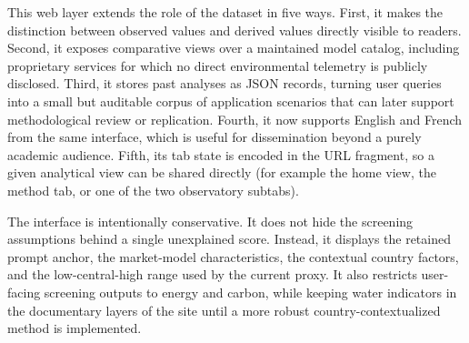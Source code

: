 \documentclass[11pt,a4paper]{article}
\begin{document}
This web layer extends the role of the dataset in five ways. First, it makes the distinction between observed values and derived values directly visible to readers. Second, it exposes comparative views over a maintained model catalog, including proprietary services for which no direct environmental telemetry is publicly disclosed. Third, it stores past analyses as JSON records, turning user queries into a small but auditable corpus of application scenarios that can later support methodological review or replication. Fourth, it now supports English and French from the same interface, which is useful for dissemination beyond a purely academic audience. Fifth, its tab state is encoded in the URL fragment, so a given analytical view can be shared directly (for example the home view, the method tab, or one of the two observatory subtabs).

The interface is intentionally conservative. It does not hide the screening assumptions behind a single unexplained score. Instead, it displays the retained prompt anchor, the market-model characteristics, the contextual country factors, and the low-central-high range used by the current proxy. It also restricts user-facing screening outputs to energy and carbon, while keeping water indicators in the documentary layers of the site until a more robust country-contextualized method is implemented.
\end{document}
